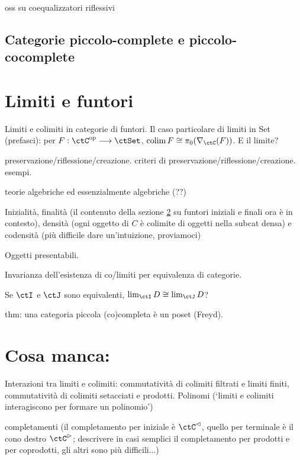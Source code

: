 oss su coequalizzatori riflessivi



\subsection{Categorie piccolo-complete e piccolo-cocomplete}

\section{Limiti e funtori}
Limiti e colimiti in categorie di funtori. Il caso particolare di limiti in Set (prefasci): per \(F : \ctC^\op\fun\ctSet\), \(\colim F\cong \pi_0(\Elts\ctC F)\). E il limite?

preservazione/riflessione/creazione. criteri di preservazione/riflessione/creazione. esempi.

teorie algebriche ed essenzialmente algebriche (??)


Inizialità, finalità (il contenuto della sezione \ref{} su funtori iniziali e finali ora è in contesto), densità (ogni oggetto di \(C\) è colimite di oggetti nella subcat densa) e codensità (più difficile dare un'intuizione, proviamoci)

Oggetti presentabili.

Invarianza dell'esistenza di co/limiti per equivalenza di categorie.

Se \(\ctI\) e \(\ctJ\) sono equivalenti, \(\lim_\ctI D\cong\lim_\ctJ D\)?

thm: una categoria piccola (co)completa è un poset (Freyd).

\section{Cosa manca:}




Interazioni tra limiti e colimiti: commutatività di colimiti filtrati e limiti finiti, commutatività di colimiti setacciati e prodotti. Polinomi (`limiti e colimiti interagiscono per formare un polinomio')

completamenti (il completamento per iniziale è \(\ctC^\lhd\), quello per terminale è il cono destro \(\ctC^\rhd\); descrivere in casi semplici il completamento per prodotti e per coprodotti, gli altri sono più difficili...)


